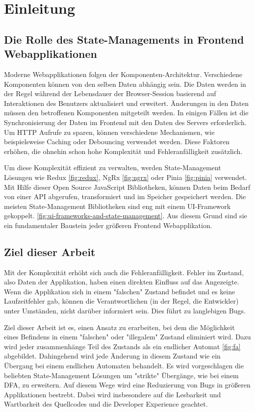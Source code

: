\chapter{Einleitung}

\section{Die Rolle des State-Managements in Frontend Webapplikationen}

Moderne Webapplikationen folgen der Komponenten-Architektur. Verschiedene Komponenten können von den selben Daten abhängig sein. Die Daten werden in der Regel während der Lebensdauer der Browser-Session basierend auf Interaktionen des Benutzers aktualisiert und erweitert. Änderungen in den Daten müssen den betroffenen Komponenten mitgeteilt werden. In einigen Fällen ist die Synchronisierung der Daten im Frontend mit den Daten des Servers erforderlich. Um HTTP Aufrufe zu sparen, können verschiedene Mechanismen, wie beispielsweise Caching oder Debouncing verwendet werden. Diese Faktoren erhöhen, die ohnehin schon hohe Komplexität und Fehleranfälligkeit zusätzlich.

Um diese Komplexität effizient zu verwalten, werden State-Management Lösungen wie Redux \ref{fig:redux}, NgRx \ref{fig:ngrx} oder Pinia \ref{fig:pinia} verwendet. Mit Hilfe dieser Open Source JavaScript Bibliotheken, können Daten beim Bedarf von einer API abgerufen, transformiert und im Speicher gespeichert werden. Die meisten State-Management Bibliotheken sind eng mit einem UI-Framework gekoppelt. \ref{fig:ui-frameworks-and-state-management}. Aus diesem Grund sind sie ein fundamentaler Baustein jeder größeren Frontend Webapplikation.

\section{Ziel dieser Arbeit}

Mit der Komplexität erhöht sich auch die Fehleranfälligkeit. Fehler im Zustand, also Daten der Applikation, haben einen direkten Einfluss auf das Angezeigte. Wenn die Applikation sich in einem "falschen" Zustand befindet und es keine Laufzeitfehler gab, können die Verantwortlichen (in der Regel, die Entwickler) unter Umständen, nicht darüber informiert sein. Dies führt zu langlebigen Bugs.

Ziel dieser Arbeit ist es, einen Ansatz zu erarbeiten, bei dem die Möglichkeit eines Befindens in einem "falschen" oder "illegalem" Zustand eliminiert wird. Dazu wird jeder zusammenhänge Teil des Zustands als ein endlicher Automat \ref{fig:fa} abgebildet. Dahingehend wird jede Änderung in diesem Zustand wie ein Übergang bei einem endlichen Automaten behandelt. Es wird vorgeschlagen die beliebten State-Management Lösungen um "strikte" Übergänge, wie bei einem DFA, zu erweitern. Auf diesem Wege wird eine Reduzierung von Bugs in größeren Applikationen bestrebt. Dabei wird insbesondere auf die Lesbarkeit und Wartbarkeit des Quellcodes und die Developer Experience geachtet.